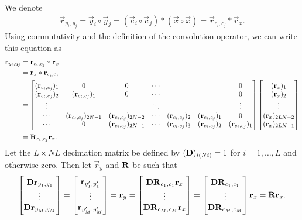 \documentclass[a4paper, openany, oneside]{memoir}
\begin{document}
We denote 
\begin{align*}
    \vec{r}_{y_i,y_j} = \vec{y}_i \circ \vec{y}_j = (\vec{c}_i \circ \vec{c}_j) \ast (\vec{x} \circ \vec{x}) = \vec{r}_{c_i,c_j} \ast \vec{r}_x.
\end{align*}
Using commutativity and the definition of the convolution operator, we can write this equation as
\begin{align*}
    \boldsymbol{\mathbf{r}}_{y_i,y_j} &=  \boldsymbol{\mathbf{r}}_{c_i,c_j} \ast \boldsymbol{\mathbf{r}}_x \\
    &= \boldsymbol{\mathbf{r}}_x \ast \boldsymbol{\mathbf{r}}_{c_i,c_j} \\
    &= \begin{bmatrix}
        (\boldsymbol{\mathbf{r}}_{c_i,c_j})_1 & 0 & 0& \cdots & & &  0 \\
        (\boldsymbol{\mathbf{r}}_{c_i,c_j})_2 & (\boldsymbol{\mathbf{r}}_{c_i,c_j})_1 & 0 & \cdots & & & 0 \\
        \vdots &  & & \ddots & &  & \vdots\\
        \cdots & (\boldsymbol{\mathbf{r}}_{c_i,c_j})_{2N-1} & (\boldsymbol{\mathbf{r}}_{c_i,c_j})_{2N-2} & \cdots & (\boldsymbol{\mathbf{r}}_{c_i,c_j})_2 & (\boldsymbol{\mathbf{r}}_{c_i,c_j})_1 & 0 \\
        \cdots & 0 & (\boldsymbol{\mathbf{r}}_{c_i,c_j})_{2N-1} & \cdots & (\boldsymbol{\mathbf{r}}_{c_i,c_j})_3 & (\boldsymbol{\mathbf{r}}_{c_i,c_j})_2 & (\boldsymbol{\mathbf{r}}_{c_i,c_j})_1 \\
    \end{bmatrix} \begin{bmatrix}
        (\boldsymbol{\mathbf{r}}_x)_1 \\
        (\boldsymbol{\mathbf{r}}_x)_2 \\
        \vdots \\
        (\boldsymbol{\mathbf{r}}_x)_{2LN-2} \\
        (\boldsymbol{\mathbf{r}}_x)_{2LN-1}
    \end{bmatrix} \\
    &= \boldsymbol{\mathbf{R}}_{c_i,c_j} \boldsymbol{\mathbf{r}}_x.
\end{align*}
Let the $L \times NL$ decimation matrix be defined by $(\boldsymbol{\mathbf{D}})_{i(Ni)} = 1$ for $i=1,\ldots,L$ and otherwise zero. Then let $\vec{r}_y$ and $\boldsymbol{\mathbf{R}}$ be such that
\begin{align*}
    \begin{bmatrix}
        \boldsymbol{\mathbf{D}}\boldsymbol{\mathbf{r}}_{y_1,y_1} \\
        \vdots \\
        \boldsymbol{\mathbf{D}}\boldsymbol{\mathbf{r}}_{y_M,y_M}
    \end{bmatrix}
    = \begin{bmatrix}
        \boldsymbol{\mathbf{r}}_{y'_1,y'_1} \\
        \vdots \\
        \boldsymbol{\mathbf{r}}_{y'_M,y'_M}
    \end{bmatrix}
    = \boldsymbol{\mathbf{r}}_y
    = \begin{bmatrix}
        \boldsymbol{\mathbf{D}}\boldsymbol{\mathbf{R}}_{c_1,c_1} \boldsymbol{\mathbf{r}}_x \\
        \vdots \\
        \boldsymbol{\mathbf{D}}\boldsymbol{\mathbf{R}}_{c_M,c_M} \boldsymbol{\mathbf{r}}_x
    \end{bmatrix}
    = \begin{bmatrix}
        \boldsymbol{\mathbf{D}}\boldsymbol{\mathbf{R}}_{c_1,c_1}\\
        \vdots \\
        \boldsymbol{\mathbf{D}}\boldsymbol{\mathbf{R}}_{c_M,c_M}
    \end{bmatrix} \boldsymbol{\mathbf{r}}_x
    = \boldsymbol{\mathbf{R}} \boldsymbol{\mathbf{r}}_x.
\end{align*}
\end{document}
